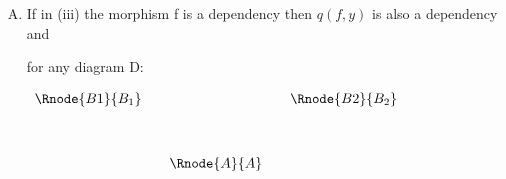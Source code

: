 \documentclass[10pt,a4paper]{scrartcl}
\begin{document}
\begin{enumerate} [A.,leftmargin=0.5cm]
\begin{enumerate}[label*=\arabic*]
\item 
{}
if also:
\begin{center}
$
\begin{array}{cp{.9cm}c}
            & & \Rnode{C}{C} \\ [1.2cm]
& & \Rnode{Bprime}{B'} \\
\end{array}
$
\end{center}
and $y \neq y'$ then $q(f,y) \comp y'$ is a s-morphism iff it is a d-morphism iff for all objects X and for all d-morphisms $x:B \dmorph X$ and 
$x':B' \dmorph X$ such that
$
\begin{array}{cp{0.1cm}cp{0.1cm}c}   
  & & \Rnode{C}{C} \\    [1.2cm] 
 \Rnode{B}{B} & & &&\Rnode{Bp}{B'}\\ [1.2cm]
  & & \Rnode{X}{X} \\
\end{array}
$
commutes there exists a d-morphism $p:A \smorph X$ such that the following diagram 
\begin{center}
\begin{displaymath}
\begin{array}{cp{.9cm}c}
          
\Rnode{A}{A}& & \Rnode{B}{B} \\ [1.2cm]
  & & \Rnode{X}{X} \\
\end{array}
\end{displaymath}
\end{center}
commutes. 
\item 
{}
Further every dependency from object $C[f|y]$ factors through either $f^*y$ or through $q(f,y)$
  
\end{enumerate}


\item If in (iii) the morphism f is a dependency then  $q(f,y)$ is also a dependency and 

\noindent for any diagram D:
\begin{center}
$
\begin{array}{cp{0cm}cp{0cm}c}
\Rnode{B1}{B_1}& &            &  &\Rnode{B2}{B_2} \\ [1.2cm]
               & &\Rnode{A}{A}& &
\end{array}
$
\end{center}


\end{enumerate}
\end{document}
